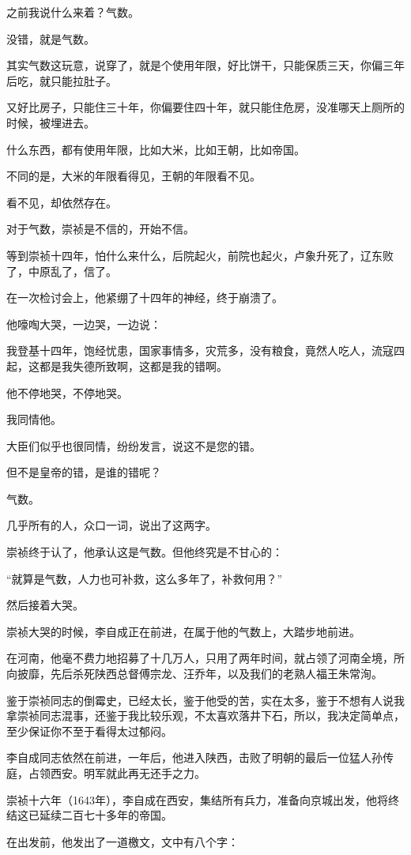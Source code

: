 \begin{multicols}{\theparacolNo}
之前我说什么来着？气数。

没错，就是气数。

其实气数这玩意，说穿了，就是个使用年限，好比饼干，只能保质三天，你偏三年后吃，就只能拉肚子。

又好比房子，只能住三十年，你偏要住四十年，就只能住危房，没准哪天上厕所的时候，被埋进去。

什么东西，都有使用年限，比如大米，比如王朝，比如帝国。

不同的是，大米的年限看得见，王朝的年限看不见。

看不见，却依然存在。

对于气数，崇祯是不信的，开始不信。

等到崇祯十四年，怕什么来什么，后院起火，前院也起火，卢象升死了，辽东败了，中原乱了，信了。

在一次检讨会上，他紧绷了十四年的神经，终于崩溃了。

他嚎啕大哭，一边哭，一边说：

我登基十四年，饱经忧患，国家事情多，灾荒多，没有粮食，竟然人吃人，流寇四起，这都是我失德所致啊，这都是我的错啊。

他不停地哭，不停地哭。

我同情他。

大臣们似乎也很同情，纷纷发言，说这不是您的错。

但不是皇帝的错，是谁的错呢？

气数。

几乎所有的人，众口一词，说出了这两字。

崇祯终于认了，他承认这是气数。但他终究是不甘心的：

“就算是气数，人力也可补救，这么多年了，补救何用？”

然后接着大哭。

崇祯大哭的时候，李自成正在前进，在属于他的气数上，大踏步地前进。

在河南，他毫不费力地招募了十几万人，只用了两年时间，就占领了河南全境，所向披靡，先后杀死陕西总督傅宗龙、汪乔年，以及我们的老熟人福王朱常洵。

鉴于崇祯同志的倒霉史，已经太长，鉴于他受的苦，实在太多，鉴于不想有人说我拿崇祯同志混事，还鉴于我比较乐观，不太喜欢落井下石，所以，我决定简单点，至少保证你不至于看得太过郁闷。

李自成同志依然在前进，一年后，他进入陕西，击败了明朝的最后一位猛人孙传庭，占领西安。明军就此再无还手之力。

崇祯十六年（1643年），李自成在西安，集结所有兵力，准备向京城出发，他将终结这已延续二百七十多年的帝国。

在出发前，他发出了一道檄文，文中有八个字：
\begin{quote}
	\begin{spacing}{0.5}  %
		\textit{{\footnotesize
				\begin{description}
					\item[\textcolor{Gray}{\faQuoteRight}] 嗟尔明朝，气数已尽。
				\end{description}
		}}
	\end{spacing}
\end{quote}


\end{multicols}
